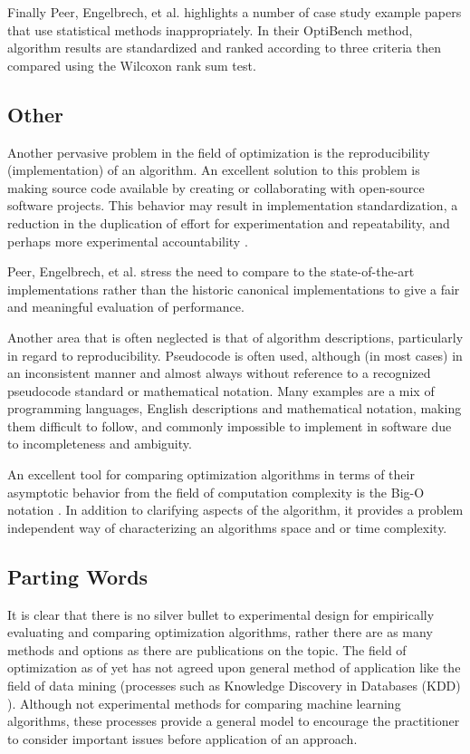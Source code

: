 \documentclass[a4paper, 11pt]{article}
\begin{document}
Finally Peer, Engelbrech, et al. \cite{Peer2003} highlights a number of case study example papers that use statistical methods inappropriately. In their OptiBench method, algorithm results are standardized and ranked according to three criteria then compared using the Wilcoxon rank sum test.

% 
% 
\subsection{Other}
Another pervasive problem in the field of optimization is the reproducibility (implementation) of an algorithm. An excellent solution to this problem is making source code available by creating or collaborating with open-source software projects. This behavior may result in implementation standardization, a reduction in the duplication of effort for experimentation and repeatability, and perhaps more experimental accountability \cite{Eiben2002, Peer2003}.

Peer, Engelbrech, et al. \cite{Peer2003} stress the need to compare to the state-of-the-art implementations rather than the historic canonical implementations to give a fair and meaningful evaluation of performance.

Another area that is often neglected is that of algorithm descriptions, particularly in regard to reproducibility. Pseudocode is often used, although (in most cases) in an inconsistent manner and almost always without reference to a recognized pseudocode standard or mathematical notation. Many examples are a mix of programming languages, English descriptions and mathematical notation, making them difficult to follow, and commonly impossible to implement in software due to incompleteness and ambiguity.

An excellent tool for comparing optimization algorithms in terms of their asymptotic behavior from the field of computation complexity is the Big-O notation \cite{Cormen2001}. In addition to clarifying aspects of the algorithm, it provides a problem independent way of characterizing an algorithms space and or time complexity.


% 
% 
\subsection{Parting Words}
It is clear that there is no silver bullet to experimental design for empirically evaluating and comparing optimization algorithms, rather there are as many methods and options as there are publications on the topic. The field of optimization as of yet has not agreed upon general method of application like the field of data mining (processes such as Knowledge Discovery in Databases (KDD) \cite{Fayyad1996}). Although not experimental methods for comparing machine learning algorithms, these processes provide a general model to encourage the practitioner to consider important issues before application of an approach.
\end{document}
